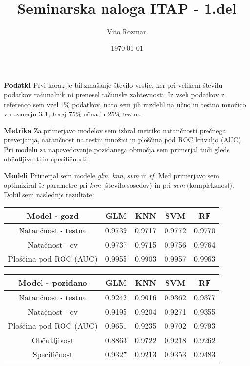 \documentclass[12pt]{article}
\title{Seminarska naloga ITAP - 1.del}
\begin{document}
    
\author{Vito Rozman}
\date{\today}
\maketitle

\textbf{Podatki} 
Prvi korak je bil zmašanje število vrstic, ker pri velikem številu podatkov računalnik ni 
prenesel računske zahtevnosti. Iz vseh podatkov z referenco sem vzel $1\%$ podatkov, nato sem jih razdelil na 
učno in testno množico v razmerju $3:1$, torej $75\%$ učna in $25\%$ testna.

\textbf{Metrika}
Za primerjavo modelov sem izbral metriko natančnosti prečnega 
preverjanja, natančnost na testni množici in ploščina pod ROC krivuljo (AUC). Pri modelu za 
napovedovanje pozidanega območja sem primerjal tudi glede občutljivosti in specifičnosti.   

\textbf{Modeli}
Primerjal sem modele \emph{glm}, \emph{knn}, \emph{svm} in \emph{rf}. Med primerjavo sem optimiziral še parametre pri 
\emph{knn} (število sosedov) 
in pri \emph{svm} (kompleksnost). Dobil sem naslednje rezultate:

\begin{center}
    \begin{tabular}{||c| c c c c||} 
     \hline
     Model - gozd & GLM & KNN & SVM & RF\\ [0.5ex] 
    \hline\hline
    Natančnost - testna	& 0.9739 & 0.9717 &	0.9772 & 0.9770\\

     \hline
     Natačnost - cv	&0.9737 & 0.9715 & 0.9756 & 0.9764\\
     \hline
     Ploščina pod ROC (AUC)	& 0.9955	& 0.9903 & 0.9957 & 0.9963 \\ 
     \hline
    \end{tabular}
\end{center}
\begin{center}
    \begin{tabular}{||c| c c c c||} 
        \hline
        Model - pozidano & GLM & KNN & SVM & RF\\ [0.5ex] 
       \hline\hline
       Natančnost - testna	& 0.9242&	0.9016&	0.9362&	0.9377\\
   
        \hline
        Natačnost - cv	&0.9195	&0.9204 & 0.9271&	0.9355\\
        \hline
        Ploščina pod ROC (AUC)	& 0.9651 & 0.9235 &	0.9702 & 0.9793\\ 
        \hline
        Občutljivost	& 0.8863 & 0.9722 &	0.9218 & 0.9262\\ 
        \hline
        Specifičnost	& 0.9327 & 0.9213 &	0.9353 & 0.9483\\ 
        \hline
       \end{tabular}
\end{center}
\end{document}
